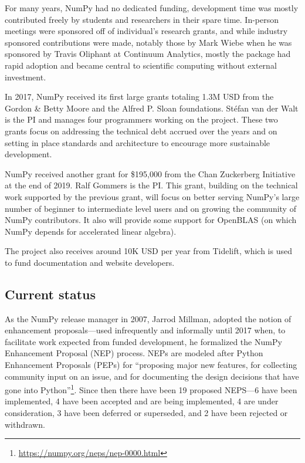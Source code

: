 For many years, NumPy had no dedicated funding, development
time was mostly contributed freely by students and researchers in
their spare time.  In-person meetings were sponsored off of
individual's research grants, and while industry sponsored
contributions were made, notably those by Mark Wiebe when he was
sponsored by Travis Oliphant at Continuum Analytics, mostly the
package had rapid adoption and became central to scientific computing
without external investment.

In 2017, NumPy received its first large grants totaling 1.3M USD from the
Gordon \& Betty Moore and the Alfred P. Sloan foundations.
Stéfan van der Walt is the PI and manages four programmers working on the project.
These two grants focus on addressing the technical debt accrued over the years and
on setting in place standards and architecture to encourage more sustainable development.

NumPy received another grant for \$195,000 from the Chan Zuckerberg
Initiative at the end of 2019.
Ralf Gommers is the PI.
This grant, building on the technical work supported by the previous
grant, will focus on better serving NumPy's large number of beginner
to intermediate level users and on growing the community of NumPy
contributors.
It also will provide some support for OpenBLAS (on which NumPy depends for
accelerated linear algebra).

The project also receives around 10K USD per year from Tidelift, which is
used to fund documentation and website developers.

\subsection*{Current status}


As the NumPy release manager in 2007, Jarrod Millman, adopted the notion
of enhancement proposals---used infrequently and informally until 2017 when,
to facilitate work expected from funded development, he formalized the
NumPy Enhancement Proposal (NEP) process.  NEPs are modeled after
Python Enhancement Proposals (PEPs) for ``proposing major new
features, for collecting community input on an issue, and for
documenting the design decisions that have gone into
Python''\footnote{\url{https://numpy.org/neps/nep-0000.html}}.
Since then there have been 19 proposed NEPS---6 have been implemented,
4 have been accepted and are being implemented, 4 are under
consideration, 3 have been deferred or superseded, and 2 have been rejected
or withdrawn.

